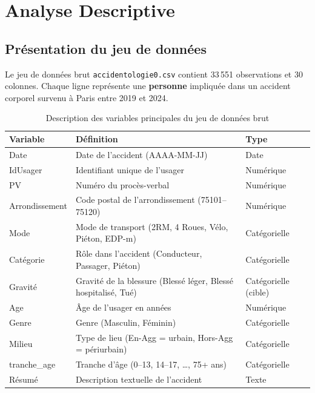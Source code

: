 \documentclass[12pt,a4paper]{article}
\begin{document}
\section{Analyse Descriptive}

\subsection{Présentation du jeu de données}

Le jeu de données brut \texttt{accidentologie0.csv} contient 33\,551
observations et 30 colonnes. Chaque ligne représente une \textbf{personne}
impliquée dans un accident corporel survenu à Paris entre 2019 et 2024.

\begin{table}[H]
\centering
\caption{Description des variables principales du jeu de données brut}
\label{tab:variables}
\small
\begin{tabular}{@{}p{3.2cm} p{6.5cm} p{2.5cm}@{}}
\toprule
\textbf{Variable} & \textbf{Définition} & \textbf{Type} \\
\midrule
Date             & Date de l'accident (AAAA-MM-JJ)                   & Date \\
IdUsager         & Identifiant unique de l'usager                     & Numérique \\
PV               & Numéro du procès-verbal                           & Numérique \\
Arrondissement   & Code postal de l'arrondissement (75101--75120)     & Numérique \\
Mode             & Mode de transport (2RM, 4 Roues, Vélo, Piéton, EDP-m) & Catégorielle \\
Catégorie        & Rôle dans l'accident (Conducteur, Passager, Piéton) & Catégorielle \\
Gravité          & Gravité de la blessure (Blessé léger, Blessé hospitalisé, Tué) & Catégorielle (cible) \\
Age              & Âge de l'usager en années                         & Numérique \\
Genre            & Genre (Masculin, Féminin)                          & Catégorielle \\
Milieu           & Type de lieu (En-Agg = urbain, Hors-Agg = périurbain) & Catégorielle \\
tranche\_age     & Tranche d'âge (0--13, 14--17, \ldots, 75+ ans)   & Catégorielle \\
Résumé           & Description textuelle de l'accident                & Texte \\
\bottomrule
\end{tabular}
\end{table}
\end{document}
